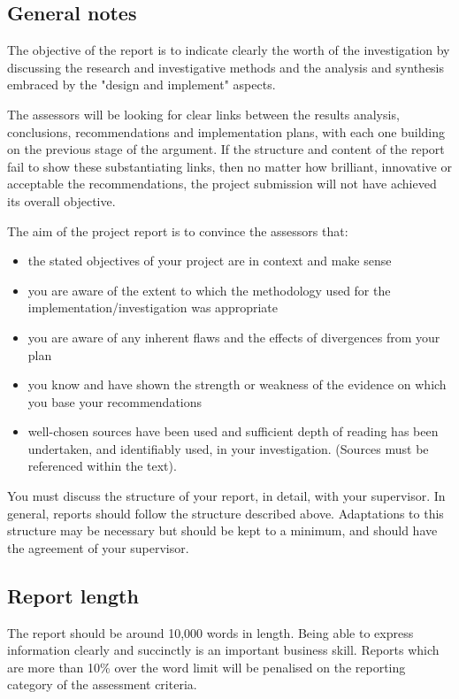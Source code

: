 \subsection{General notes}

The objective of the report is to indicate clearly the worth of the investigation by discussing the
research and investigative methods and the analysis and synthesis embraced by the "design and implement" aspects.

The assessors will be looking for clear links between the results analysis, conclusions, recommendations and implementation plans, with each one building on the previous stage of the argument. If the structure and content of the report fail to show these substantiating links, then no matter how brilliant, innovative or acceptable the recommendations, the project submission will not have achieved its overall objective.

The aim of the project report is to convince the assessors that:

\begin{itemize}
    \item the stated objectives of your project are in context and make sense
    \item you are aware of the extent to which the methodology used for the implementation/investigation was appropriate
    \item you are aware of any inherent flaws and the effects of divergences from your plan
    \item you know and have shown the strength or weakness of the evidence on which you base your recommendations
    \item well-chosen sources have been used and sufficient depth of reading has been
    undertaken, and identifiably used, in your investigation. (Sources must be referenced
    within the text).
\end{itemize}

You must discuss the structure of your report, in detail, with your supervisor. In general, reports should follow the structure described above. Adaptations to this structure may be necessary but should be kept to a minimum, and should have the agreement of your supervisor.


\subsection{Report length}

The report should be around 10,000 words in length. Being able to express information clearly and succinctly is an important business skill. Reports which are more than 10\% over the word limit will be penalised on the reporting category of the assessment criteria.

